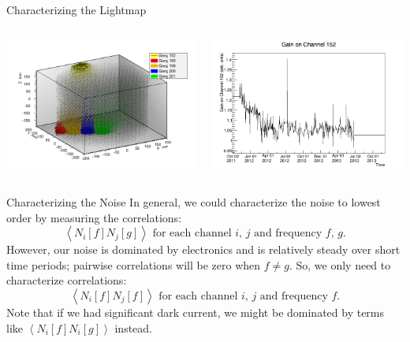 \documentclass[final]{beamer} %
\begin{document}
\begin{frame}{}
\begin{columns}[t]
\begin{column}{.3\linewidth}
\begin{block}{\large Characterizing the Lightmap}
      \begin{columns}
        \begin{column}{0.49\linewidth}
           \includegraphics[keepaspectratio=true,width=\textwidth,clip=true,trim=15mm 10mm 10mm 10mm]{Lightmap_viz_zoom.png}
         \end{column}
        \begin{column}{0.49\linewidth}
          \includegraphics[keepaspectratio=true,width=\textwidth,clip=true,trim=5mm 0mm 20mm 15mm]{gainfunc_152.png}
        \end{column}
      \end{columns}
    \end{block}

    \begin{block}{\large Characterizing the Noise}
In general, we could characterize the noise to lowest order by measuring the correlations:
\[\left< N_i[f] N_j[g] \right>\text{ for each channel $i$, $j$ and frequency $f$, $g$.}\]
However, our noise is dominated by electronics and is relatively steady over short time periods; pairwise correlations will be zero when $f \ne g$.  So, we only need to characterize correlations:
\[\left< N_i[f] N_j[f] \right>\text{ for each channel $i$, $j$ and frequency $f$.}\]
Note that if we had significant dark current, we might be dominated by terms like $\left< N_i[f] N_i[g] \right>$ instead.


\end{block}
\end{column}
\end{columns}
\end{frame}
\end{document}

